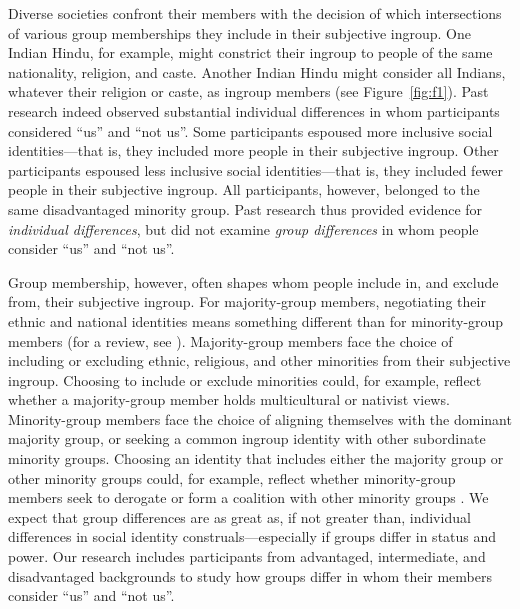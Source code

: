 \documentclass[12pt, a4paper]{article}
\begin{document}
Diverse societies confront their members with the decision of which intersections of various group memberships they include in their subjective ingroup. One Indian Hindu, for example, might constrict their ingroup to people of the same nationality, religion, and caste. Another Indian Hindu might consider all Indians, whatever their religion or caste, as ingroup members (see Figure~\ref{fig:f1}). Past research \cite{dommelen_construing_2015} indeed observed substantial individual differences in whom participants considered ``us'' and ``not us''. Some participants espoused more inclusive social identities---that is, they included more people in their subjective ingroup. Other participants espoused less inclusive social identities---that is, they included fewer people in their subjective ingroup. All participants, however, belonged to the same disadvantaged minority group. Past research thus provided evidence for \emph{individual differences}, but did not examine \emph{group differences} in whom people consider ``us'' and ``not us''.

Group membership, however, often shapes whom people include in, and exclude from, their subjective ingroup. For majority-group members, negotiating their ethnic and national identities means something different than for minority-group members (for a review, see ). Majority-group members face the choice of including or excluding ethnic, religious, and other minorities from their subjective ingroup. Choosing to include or exclude minorities could, for example, reflect whether a majority-group member holds multicultural or nativist views. Minority-group members face the choice of aligning themselves with the dominant majority group, or seeking a common ingroup identity with other subordinate minority groups. Choosing an identity that includes either the majority group or other minority groups could, for example, reflect whether minority-group members seek to derogate or form a coalition with other minority groups \cite{craig_coalition_2012}. We expect that group differences are as great as, if not greater than, individual differences in social identity construals---especially if groups differ in status and power. Our research includes participants from advantaged, intermediate, and disadvantaged backgrounds to study how groups differ in whom their members consider ``us'' and ``not us''.
\end{document}
